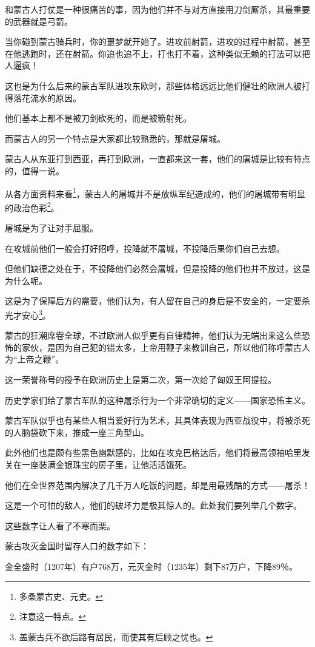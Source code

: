 \begin{multicols}{\theparacolNo}
		和蒙古人打仗是一种很痛苦的事，因为他们并不与对方直接用刀剑厮杀，其最重要的武器就是弓箭。

		当你碰到蒙古骑兵时，你的噩梦就开始了。进攻前射箭，进攻的过程中射箭，甚至在他逃跑时，还在射箭。你追也追不上，打也打不着，这种类似无赖的打法可以把人逼疯！

		这也是为什么后来的蒙古军队进攻东欧时，那些体格远远比他们健壮的欧洲人被打得落花流水的原因。

		他们基本上都不是被刀剑砍死的，而是被箭射死。

		而蒙古人的另一个特点是大家都比较熟悉的，那就是屠城。

		蒙古人从东亚打到西亚，再打到欧洲，一直都来这一套，他们的屠城是比较有特点的，值得一说。

		从各方面资料来看\footnote{多桑蒙古史、元史。}，蒙古人的屠城并不是放纵军纪造成的，他们的屠城带有明显的政治色彩\footnote{注意这一特点。}。

		屠城是为了让对手屈服。

		在攻城前他们一般会打好招呼，投降就不屠城，不投降后果你们自己去想。

		但他们缺德之处在于，不投降他们必然会屠城，但是投降的他们也并不放过，这是为什么呢。

		这是为了保障后方的需要，他们认为，有人留在自己的身后是不安全的，一定要杀光才安心\footnote{盖蒙古兵不欲后路有居民，而使其有后顾之忧也。}。

		蒙古的狂潮席卷全球，不过欧洲人似乎更有自律精神，他们认为无端出来这么些恐怖的家伙，是因为自己犯的错太多，上帝用鞭子来教训自己，所以他们称呼蒙古人为“上帝之鞭”。

		这一荣誉称号的授予在欧洲历史上是第二次，第一次给了匈奴王阿提拉。

		历史学家们给了蒙古军队的这种屠杀行为一个非常确切的定义——国家恐怖主义。

		蒙古军队似乎也有某些人相当爱好行为艺术，其具体表现为西亚战役中，将被杀死的人脑袋砍下来，推成一座三角型山。

		此外他们也是颇有些黑色幽默感的，比如在攻克巴格达后，他们将最高领袖哈里发关在一座装满金银珠宝的房子里，让他活活饿死。

		他们在全世界范围内解决了几千万人吃饭的问题，却是用最残酷的方式——屠杀！

		这是一个可怕的敌人，他们的破坏力是极其惊人的。此处我们要列举几个数字。

		这些数字让人看了不寒而栗。

		蒙古攻灭金国时留存人口的数字如下：

		金全盛时（1207年）有户768万，元灭金时（1235年）剩下87万户，下降89％。


\end{multicols}
